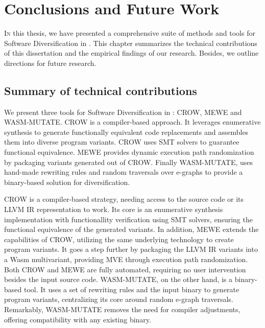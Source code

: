 
\chapter{Conclusions and Future Work}
\label{results}



\lettrine[lines=4]{I}{n} this thesis, we have presented a comprehensive suite of methods and tools for Software Diversification in \Wasm.
This chapter summarizes the technical contributions of this dissertation and the empirical findings of our research.
Besides, we outline directions for future research.

\section{Summary of technical contributions}

We present three tools for Software Diversification in \Wasm: CROW, MEWE and WASM-MUTATE.
CROW is a compiler-based approach.
It leverages enumerative synthesis to generate functionally equivalent code replacements and assembles them into diverse \wasm program variants. 
CROW uses SMT solvers to guarantee functional equivalence.
MEWE provides dynamic execution path randomization by packaging variants generated out of CROW.
Finally WASM-MUTATE, uses hand-made rewriting rules and random traversals over e-graphs to provide a binary-based solution for \Wasm diversification.


CROW is a compiler-based strategy, needing access to the source code or its LLVM IR representation to work. 
Its core is an enumerative synthesis implementation with functionallity verification using SMT solvers, ensuring the functional equivalence of the generated variants.
In addition, MEWE extends the capabilities of CROW, utilizing the same underlying technology to create program variants. 
It goes a step further by packaging the LLVM IR variants into a Wasm multivariant, providing MVE through execution path randomization.
Both CROW and MEWE are fully automated, requiring no user intervention besides the input source code.
WASM-MUTATE, on the other hand, is a binary-based tool.
It uses a set of rewriting rules and the input \wasm binary to generate program variants, centralizing its core around random e-graph traversals. 
Remarkably, WASM-MUTATE removes the need for compiler adjustments, offering compatibility with any existing \Wasm binary. 



